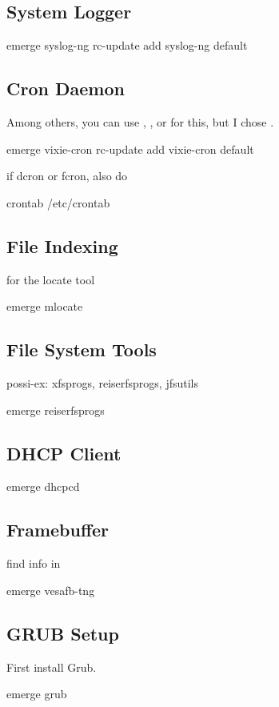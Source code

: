 \subsection{System Logger}
\begin{code}
emerge syslog-ng
rc-update add syslog-ng default
\end{code}

\subsection{Cron Daemon}
Among others, you can use , , or  for this, but I chose .
\begin{code}
emerge vixie-cron
rc-update add vixie-cron default
\end{code}
if dcron or fcron, also do
\begin{code}
crontab /etc/crontab
\end{code}

\subsection{File Indexing}
for the locate tool
\begin{code}
emerge mlocate
\end{code}

\subsection{File System Tools}
possi-ex: xfsprogs, reiserfsprogs, jfsutils
\begin{code}
emerge reiserfsprogs
\end{code}

\subsection{DHCP Client}
\begin{code}
emerge dhcpcd
\end{code}

\subsection{Framebuffer}
find info in 
\begin{code}
emerge vesafb-tng
\end{code}

\subsection{GRUB Setup}
First install Grub.
\begin{code}
emerge grub
\end{code}

